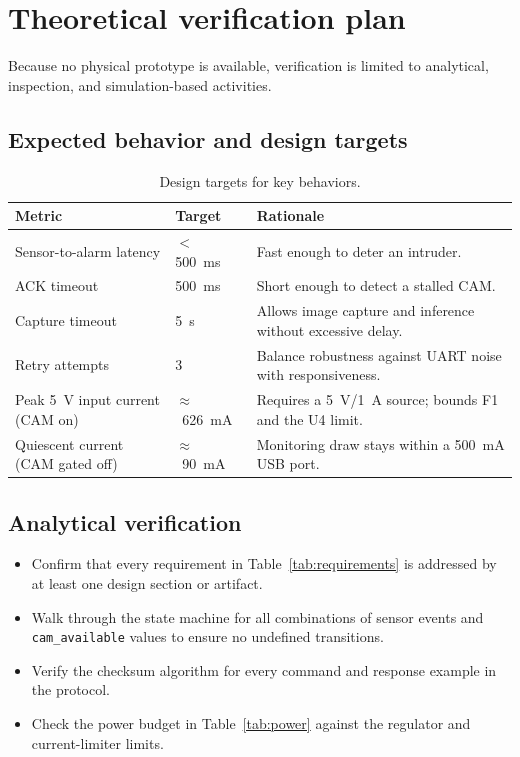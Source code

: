 \documentclass[11pt,a4paper]{article}
\begin{document}
\section{Theoretical verification plan}

Because no physical prototype is available, verification is limited to
analytical, inspection, and simulation-based activities.

\subsection{Expected behavior and design targets}

\begin{table}[H]
    \centering
    \caption{Design targets for key behaviors.}
    \begin{tabular}{@{}llp{6cm}@{}}
        \toprule
        \textbf{Metric} & \textbf{Target} & \textbf{Rationale} \\
        \midrule
        Sensor-to-alarm latency & $<$ 500~ms & Fast enough to deter an intruder. \\
        ACK timeout & 500~ms & Short enough to detect a stalled CAM. \\
        Capture timeout & 5~s & Allows image capture and inference without excessive delay. \\
        Retry attempts & 3 & Balance robustness against UART noise with responsiveness. \\
        Peak 5~V input current (CAM on) & $\approx$~626~mA & Requires a 5~V/1~A source; bounds F1 and the U4 limit. \\
        Quiescent current (CAM gated off) & $\approx$~90~mA & Monitoring draw stays within a 500~mA USB port. \\
        \bottomrule
    \end{tabular}
\end{table}

\subsection{Analytical verification}

\begin{itemize}
    \item Confirm that every requirement in Table~\ref{tab:requirements} is addressed by at least one design section or artifact.
    \item Walk through the state machine for all combinations of sensor events and \texttt{cam\_available} values to ensure no undefined transitions.
    \item Verify the checksum algorithm for every command and response example in the protocol.
    \item Check the power budget in Table~\ref{tab:power} against the regulator and current-limiter limits.
\end{itemize}
\end{document}
